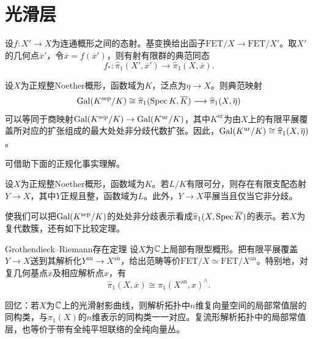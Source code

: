 \section{光滑层}\label{L10S2}
设$f:X'\to X$为连通概形之间的态射。基变换给出函子$\mathrm{FET}/X\to\mathrm{FET}/X'$。取$X'$的几何点$\overline x'$，令$\overline x=f(\overline x')$，则有射有限群的典范同态
\[f_*:\widehat\pi_1(X',\overline x')\to\widehat\pi_1(X,\overline x).\]
\begin{theorem}\label{L10S2O1}
设$X$为正规整Noether概形，函数域为$K$，泛点为$\eta\to X$。则典范映射
\[\operatorname{Gal}(K^{\mathrm{sep}}/K)\cong\widehat\pi_1(\operatorname{Spec} K,\overline K)\longrightarrow\widehat\pi_1(X,\overline\eta)\]
可以等同于商映射$\operatorname{Gal}(K^{\mathrm{sep}}/K)\to\operatorname{Gal}(K^{\mathrm{ur}}/K)$，其中$K^{\mathrm{ur}}$为由$X$上的有限平展覆盖所对应的扩张组成的最大处处非分歧代数扩张。因此，$\operatorname{Gal}(K^{\mathrm{ur}}/K)\cong\widehat\pi_1(X,\overline\eta)$。
\end{theorem}
可借助下面的正规化事实理解。
\begin{lemma}\label{L10S2O2}
设$X$为正规整Noether概形，函数域为$K$。若$L/K$有限可分，则存在有限支配态射$Y\to X$，其中$Y$正规且整，函数域为$L$。此外，$Y\to X$平展当且仅当它非分歧。
\end{lemma}
使我们可以把$\operatorname{Gal}(K^{\mathrm{sep}}/K)$的处处非分歧表示看成$\widehat\pi_1(X,\operatorname{Spec}\overline K)$的表示。若$X$为复代数簇，还有如下比较定理。
\begin{theorem}{Grothendieck--Riemann存在定理}\label{L10S2O3}
设$X$为$\mathbb{C}$上局部有限型概形。把有限平展覆盖$Y\to X$送到其解析化$Y^{\mathrm{an}}\to X^{\mathrm{an}}$，给出范畴等价$\mathrm{FET}/X\simeq\mathrm{FET}/X^{\mathrm{an}}$。特别地，对复几何基点$\overline x$及相应解析点$x$，有
\[\widehat\pi_1(X,\overline x)\cong\pi_1(X^{\mathrm{an}},x)^\wedge.\]
\end{theorem}
回忆：若$X$为$\mathbb{C}$上的光滑射影曲线，则解析拓扑中$n$维复向量空间的局部常值层的同构类，与$\pi_1(X)$的$n$维表示的同构类一一对应。复流形解析拓扑中的局部常值层，也等价于带有全纯平坦联络的全纯向量丛。

